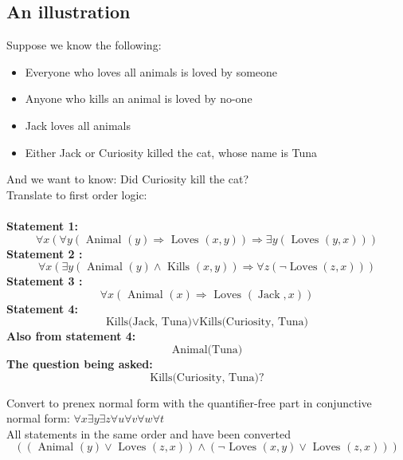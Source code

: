 \documentclass{article}[18pt]
\begin{document}
\subsection{An illustration}
Suppose we know the following:
\begin{itemize}
	\item Everyone who loves all animals is loved by someone
	\item Anyone who kills an animal is loved by no-one
	\item Jack loves all animals
	\item Either Jack or Curiosity killed the cat, whose name is Tuna
\end{itemize}
And we want to know: Did Curiosity kill the cat?\\
Translate to first order logic:\\
\\
\textbf{Statement 1:}
\begin{equation}\label{eq:1}\forall x ( \forall y ( \text { Animal } ( y ) \Rightarrow \text { Loves } ( x , y ) ) \Rightarrow \exists y ( \text { Loves } ( y , x ) ) )
\end{equation}
\textbf{Statement 2 : }
\begin{equation}\label{eq:2}\forall x ( \exists y ( \text { Animal } ( y ) \wedge \text { Kills } ( x , y ) ) \Rightarrow \forall z ( \neg \operatorname { Loves } ( z , x ) ) )\end{equation}
\textbf{Statement 3 :}
\begin{equation}\label{eq:3}\forall x ( \text { Animal } ( x ) \Rightarrow \text { Loves } ( \operatorname { Jack } , x ) )\end{equation}
\textbf{Statement 4:}
\begin{equation}\label{eq:4}\text{Kills(Jack, Tuna)} \lor \text{Kills(Curiosity, Tuna)}\end{equation}
\textbf{Also from statement 4:}
\begin{equation}\label{eq:5}\text{Animal(Tuna)}\end{equation}
\textbf{The question being asked:}
\begin{equation}\label{eq:6}\text{Kills(Curiosity, Tuna)}?\end{equation}

Convert to prenex normal form with the quantifier-free part in conjunctive normal form: $\forall x \exists y \exists z \forall u \forall v \forall w \forall t$\\
All statements in the same order and have been converted
\setcounter{equation}{0}
\begin{equation}\label{eq:7}( ( \text { Animal } ( y ) \vee \text { Loves } ( z , x ) ) \wedge ( \neg \text { Loves } ( x , y ) \vee \text { Loves } ( z , x ) ) )\end{equation}
\end{document}
